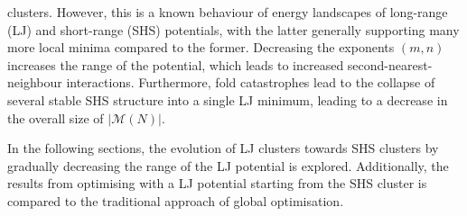 clusters\autocite{Doye_Evolutionpotentialenergy_1999}. However, this is a known
behaviour of energy landscapes of long-range (\ac{LJ}) and short-range
(\ac{SHS}) potentials, with the latter generally supporting many more local
minima compared to the
former.\autocite{braier90,Wales_MicroscopicBasisGlobal_2001} Decreasing the
exponents $(m,n)$ increases the range of the potential, which leads to increased
second-nearest-neighbour interactions. Furthermore, fold
catastrophes\autocite{Wales_MicroscopicBasisGlobal_2001,Wales_Energylandscapes_2003}
lead to the collapse of several stable \ac{SHS} structure into a single \ac{LJ}
minimum, leading to a decrease in the overall size of $|\mathcal{M}(N)|$.

In the following sections, the evolution of \ac{LJ} clusters towards \ac{SHS}
clusters by gradually decreasing the range of the \ac{LJ} potential is explored.
Additionally, the results from optimising with a \ac{LJ} potential starting from
the \ac{SHS} cluster is compared to the traditional approach of global
optimisation.



